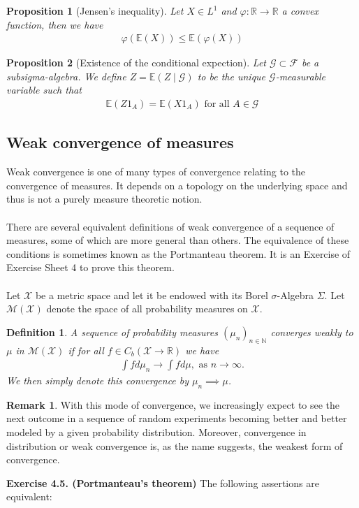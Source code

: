 \documentclass[11pt,a4paper, final]{article}
\newtheorem{prop}{Proposition}[section]
\newtheorem{defn}{Definition}[section]
\theoremstyle{definition}
\newtheorem{rem}{Remark}[section]
\begin{document}
\begin{prop}[Jensen's inequality] Let $X \in L^1$ and $\varphi: \mathbb{R} \to \mathbb{R}$ a convex function, then we have 
\begin{align*}
\varphi( \mathbb{E}(X)) \leq \mathbb{E}( \varphi(X))
\end{align*}
\end{prop}
\begin{prop}[Existence of the conditional expection] Let $\mathcal{G} \subset \mathcal{F}$ be a subsigma-algebra. We define $Z= \mathbb{E}(Z \mid \mathcal{G})$ to be the unique $\mathcal{G}$-measurable variable such that 
\begin{align*}
\mathbb{E}(Z 1_A) = \mathbb{E}(X 1_A) \text{ for all } A \in \mathcal{G}
\end{align*}
\end{prop}
\newpage
\subsection{Weak convergence of measures}
Weak convergence is one of many types of convergence relating to the convergence of measures. It depends on a topology on the underlying space and thus is not a purely measure theoretic notion. 
\\\\
There are several equivalent definitions of weak convergence of a sequence of measures, some of which are more general than others. The equivalence of these conditions is sometimes known as the Portmanteau theorem. It is an Exercise of Exercise Sheet 4 to prove this theorem.
\\\\
Let $\mathcal{X}$ be a metric space and let it be endowed with its Borel $\sigma$-Algebra $\Sigma$. Let $\mathcal{M}( \mathcal{X})$ denote the space of all probability measures on $\mathcal{X}$. 
\begin{defn} A sequence of probability measures $( \mu_n)_{n \in \mathbb{N}}$ converges weakly to $\mu$ in $\mathcal{M}( \mathcal{X})$ if for all $f \in C_b( \mathcal{X} \to \mathbb{R})$ we have
\begin{align*}
\int f d \mu_n \to \int f d \mu, \text{ as } n \to \infty. \tag{*}
\end{align*}
We then simply denote this convergence by $\mu_n \implies \mu$. 
\end{defn}
\begin{rem}With this mode of convergence, we increasingly expect to see the next outcome in a sequence of random experiments becoming better and better modeled by a given probability distribution. Moreover, convergence in distribution or weak convergence is, as the name suggests, the weakest form of convergence. 
\end{rem}
\noindent 
\textbf{Exercise 4.5. (Portmanteau's theorem)} The following assertions are equivalent:
\end{document}
